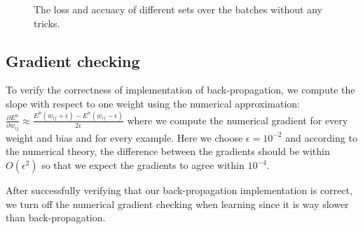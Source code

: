 \documentclass{article} %
\begin{document}
\begin{figure} [!htbp]
	
	\caption{The loss and accuacy of different sets over the batches without any tricks. }  
	
\end{figure}

\subsection{Gradient checking}
To verify the correctness of implementation of back-propagation, we compute the slope with respect to one weight using the numerical approximation: $\frac{\partial E^{n}}{\partial w_{ij}} \approx \frac{E^{n}(w_{ij}+\epsilon)-E^{n}(w_{ij}-\epsilon)}{2\epsilon}$ where we compute the numerical gradient for every weight and bias and for every example. Here we choose $\epsilon = 10^{-2}$ and according to the numerical theory, the difference between the gradients should be within $O(\epsilon^{2})$ so that we expect the gradients to agree within $10^{-4}$. 

After successfully verifying that our back-propagation implementation is correct, we turn off the numerical gradient checking when learning since it is way slower than back-propagation.
\end{document}
